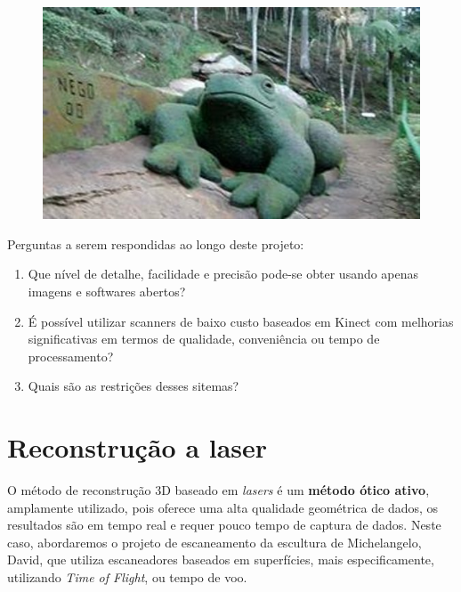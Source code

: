 \documentclass[table, usenames, svgnames, xcolor=dvipsnames]{beamer}
\begin{document}
\begin{frame} 
	\begin{figure}[!h]
		\centering
		\includegraphics[width=0.7\linewidth]{figs/jardim-do-nego32.jpg}
	\end{figure}
\end{frame}

\begin{frame}

Perguntas a serem respondidas ao longo deste projeto:

	\begin{enumerate}
	\item {Que nível de detalhe, facilidade e precisão pode-se obter usando apenas imagens e softwares abertos?}
	\item {É possível utilizar scanners de baixo custo baseados em Kinect com melhorias significativas em termos de qualidade, conveniência ou tempo de processamento?}
	\item {Quais são as restrições desses sitemas?}
	\end{enumerate}
	
\end{frame}

\section{Reconstrução a laser}

\begin{frame} 
	\begin{center}
    O método de reconstrução 3D baseado em \emph{lasers} é um \textbf{método ótico ativo}, amplamente utilizado, pois oferece uma alta qualidade geométrica de dados, os resultados são em tempo real e requer pouco tempo de captura de dados.
Neste caso, abordaremos o projeto de escaneamento da escultura de Michelangelo, David, que utiliza escaneadores baseados em superfícies, mais especificamente, utilizando \emph{Time of Flight}, ou tempo de voo.
	\end{center}
\end{frame}
\end{document}
